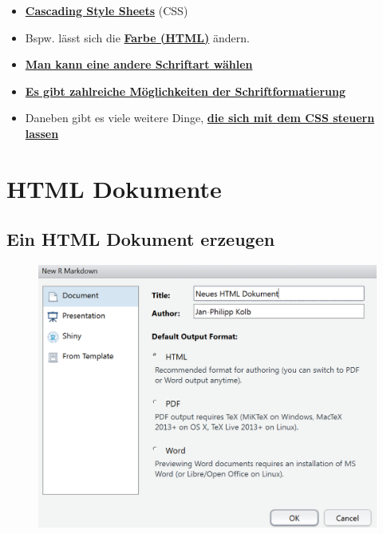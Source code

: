 \documentclass[]{article}
\begin{document}
\begin{itemize}
\item
  \href{https://de.wikipedia.org/wiki/Cascading_Style_Sheets}{\textbf{Cascading
  Style Sheets}} (CSS)
\item
  Bspw. lässt sich die
  \href{http://tomheller.de/html-farben.html}{\textbf{Farbe (HTML)}}
  ändern.
\item
  \href{https://www.mediaevent.de/css/font-family.html}{\textbf{Man kann
  eine andere Schriftart wählen}}
\item
  \href{https://wiki.selfhtml.org/wiki/CSS/Eigenschaften/Schriftformatierung}{\textbf{Es
  gibt zahlreiche Möglichkeiten der Schriftformatierung}}
\item
  Daneben gibt es viele weitere Dinge,
  \href{https://www.w3.org/TR/WCAG20-TECHS/C22.html}{\textbf{die sich
  mit dem CSS steuern lassen}}
\end{itemize}

\section{HTML Dokumente}\label{html-dokumente}

\subsection{Ein HTML Dokument
erzeugen}\label{ein-html-dokument-erzeugen}

\begin{figure}
\centering
\includegraphics{figure/NewHTML.PNG}
\caption{}
\end{figure}
\end{document}
